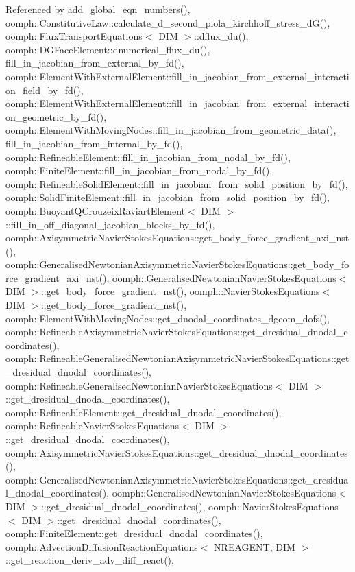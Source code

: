 Referenced by add\+\_\+global\+\_\+eqn\+\_\+numbers(), oomph\+::\+Constitutive\+Law\+::calculate\+\_\+d\+\_\+second\+\_\+piola\+\_\+kirchhoff\+\_\+stress\+\_\+d\+G(), oomph\+::\+Flux\+Transport\+Equations$<$ D\+I\+M $>$\+::dflux\+\_\+du(), oomph\+::\+D\+G\+Face\+Element\+::dnumerical\+\_\+flux\+\_\+du(), fill\+\_\+in\+\_\+jacobian\+\_\+from\+\_\+external\+\_\+by\+\_\+fd(), oomph\+::\+Element\+With\+External\+Element\+::fill\+\_\+in\+\_\+jacobian\+\_\+from\+\_\+external\+\_\+interaction\+\_\+field\+\_\+by\+\_\+fd(), oomph\+::\+Element\+With\+External\+Element\+::fill\+\_\+in\+\_\+jacobian\+\_\+from\+\_\+external\+\_\+interaction\+\_\+geometric\+\_\+by\+\_\+fd(), oomph\+::\+Element\+With\+Moving\+Nodes\+::fill\+\_\+in\+\_\+jacobian\+\_\+from\+\_\+geometric\+\_\+data(), fill\+\_\+in\+\_\+jacobian\+\_\+from\+\_\+internal\+\_\+by\+\_\+fd(), oomph\+::\+Refineable\+Element\+::fill\+\_\+in\+\_\+jacobian\+\_\+from\+\_\+nodal\+\_\+by\+\_\+fd(), oomph\+::\+Finite\+Element\+::fill\+\_\+in\+\_\+jacobian\+\_\+from\+\_\+nodal\+\_\+by\+\_\+fd(), oomph\+::\+Refineable\+Solid\+Element\+::fill\+\_\+in\+\_\+jacobian\+\_\+from\+\_\+solid\+\_\+position\+\_\+by\+\_\+fd(), oomph\+::\+Solid\+Finite\+Element\+::fill\+\_\+in\+\_\+jacobian\+\_\+from\+\_\+solid\+\_\+position\+\_\+by\+\_\+fd(), oomph\+::\+Buoyant\+Q\+Crouzeix\+Raviart\+Element$<$ D\+I\+M $>$\+::fill\+\_\+in\+\_\+off\+\_\+diagonal\+\_\+jacobian\+\_\+blocks\+\_\+by\+\_\+fd(), oomph\+::\+Axisymmetric\+Navier\+Stokes\+Equations\+::get\+\_\+body\+\_\+force\+\_\+gradient\+\_\+axi\+\_\+nst(), oomph\+::\+Generalised\+Newtonian\+Axisymmetric\+Navier\+Stokes\+Equations\+::get\+\_\+body\+\_\+force\+\_\+gradient\+\_\+axi\+\_\+nst(), oomph\+::\+Generalised\+Newtonian\+Navier\+Stokes\+Equations$<$ D\+I\+M $>$\+::get\+\_\+body\+\_\+force\+\_\+gradient\+\_\+nst(), oomph\+::\+Navier\+Stokes\+Equations$<$ D\+I\+M $>$\+::get\+\_\+body\+\_\+force\+\_\+gradient\+\_\+nst(), oomph\+::\+Element\+With\+Moving\+Nodes\+::get\+\_\+dnodal\+\_\+coordinates\+\_\+dgeom\+\_\+dofs(), oomph\+::\+Refineable\+Axisymmetric\+Navier\+Stokes\+Equations\+::get\+\_\+dresidual\+\_\+dnodal\+\_\+coordinates(), oomph\+::\+Refineable\+Generalised\+Newtonian\+Axisymmetric\+Navier\+Stokes\+Equations\+::get\+\_\+dresidual\+\_\+dnodal\+\_\+coordinates(), oomph\+::\+Refineable\+Generalised\+Newtonian\+Navier\+Stokes\+Equations$<$ D\+I\+M $>$\+::get\+\_\+dresidual\+\_\+dnodal\+\_\+coordinates(), oomph\+::\+Refineable\+Element\+::get\+\_\+dresidual\+\_\+dnodal\+\_\+coordinates(), oomph\+::\+Refineable\+Navier\+Stokes\+Equations$<$ D\+I\+M $>$\+::get\+\_\+dresidual\+\_\+dnodal\+\_\+coordinates(), oomph\+::\+Axisymmetric\+Navier\+Stokes\+Equations\+::get\+\_\+dresidual\+\_\+dnodal\+\_\+coordinates(), oomph\+::\+Generalised\+Newtonian\+Axisymmetric\+Navier\+Stokes\+Equations\+::get\+\_\+dresidual\+\_\+dnodal\+\_\+coordinates(), oomph\+::\+Generalised\+Newtonian\+Navier\+Stokes\+Equations$<$ D\+I\+M $>$\+::get\+\_\+dresidual\+\_\+dnodal\+\_\+coordinates(), oomph\+::\+Navier\+Stokes\+Equations$<$ D\+I\+M $>$\+::get\+\_\+dresidual\+\_\+dnodal\+\_\+coordinates(), oomph\+::\+Finite\+Element\+::get\+\_\+dresidual\+\_\+dnodal\+\_\+coordinates(), oomph\+::\+Advection\+Diffusion\+Reaction\+Equations$<$ N\+R\+E\+A\+G\+E\+N\+T, D\+I\+M $>$\+::get\+\_\+reaction\+\_\+deriv\+\_\+adv\+\_\+diff\+\_\+react(), 